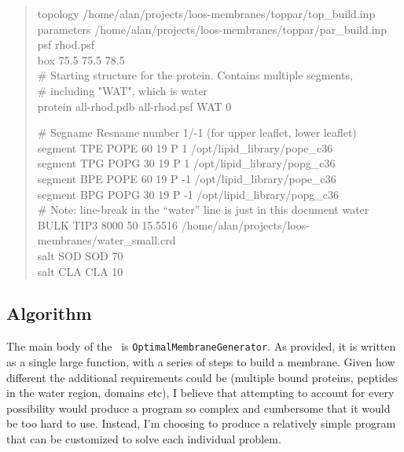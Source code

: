 \documentclass[12pt]{article}
\begin{document}
\begin{quote}
topology /home/alan/projects/loos-membranes/toppar/top\_build.inp \\
parameters /home/alan/projects/loos-membranes/toppar/par\_build.inp \\
psf      rhod.psf \\
box      75.5  75.5  78.5 \\

\# Starting structure for the protein.  Contains multiple segments, \\
\# including "WAT", which is water \\
protein  all-rhod.pdb all-rhod.psf WAT 0

\# Segname  Resname number 1/-1 (for upper leaflet, lower leaflet) \\
segment TPE   POPE     60    19    P 1      /opt/lipid\_library/pope\_c36 \\
segment TPG   POPG     30    19    P 1      /opt/lipid\_library/popg\_c36 \\
segment BPE   POPE     60    19   P  -1     /opt/lipid\_library/pope\_c36 \\
segment BPG   POPG     30    19   P  -1     /opt/lipid\_library/popg\_c36 \\

\# Note: line-break in the ``water'' line is just in this document
water   BULK     TIP3      8000       50      15.5516
/home/alan/projects/loos-membranes/water\_small.crd \\
salt    SOD       SOD      70 \\
salt    CLA       CLA      10 \\

\end{quote}

\subsection{Algorithm}
\label{ss:algorithm}

The main body of the \omgwtf\ is {\tt OptimalMembraneGenerator}.  As
provided, it is written as a single large function, with a series of steps to
build a membrane.  Given how different the additional requirements could be
(multiple bound proteins, peptides in the water region, domains
etc),  I believe that attempting to account for every possibility would
produce a program so complex and cumbersome that it would be too hard to use.
Instead, I'm choosing to produce a relatively simple program that can be
customized to solve each individual problem.
\end{document}
